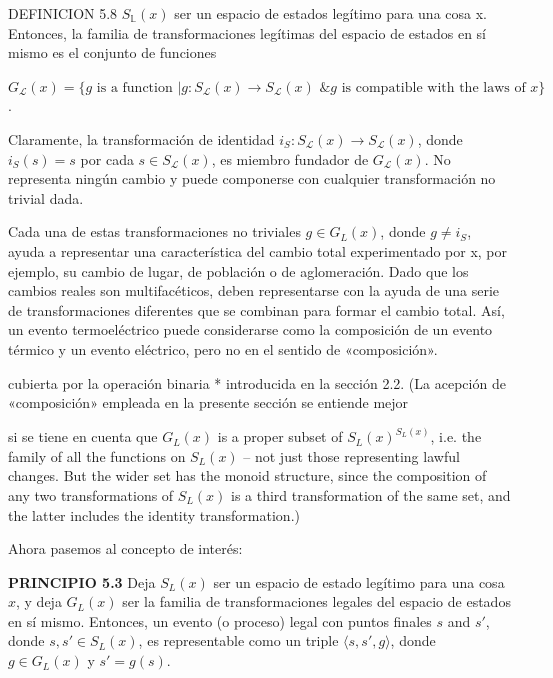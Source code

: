 \begin{justifying}
    DEFINICION 5.8 $S_{\mathbb{L}}(x)$ ser un espacio de estados legítimo para una cosa x. Entonces, la
familia de transformaciones legítimas del espacio de estados en sí mismo es el conjunto de
funciones
    \begin{center}
        $G_{\mathcal{L}}(x)=\{g \text{ is a function } |g:S_{\mathcal{L}}(x)\rightarrow S_{\mathcal{L}}(x)
        \text{ \& } g \text{ is compatible with the laws of } x\}$.
    \end{center}

    Claramente, la transformación de identidad $i_{S}: S_{\mathcal{L}}(x)\rightarrow S_{\mathcal{L}}(x)$, donde $i_{S}(s)=s$ por cada $s\in S_{\mathcal{L}}(x)$, es miembro fundador de $G_{\mathcal{L}}(x)$. No representa ningún cambio y puede componerse con cualquier transformación no trivial dada.

Cada una de estas transformaciones no triviales $g \in G_L(x)$, donde $g \neq i_S$, ayuda a representar una característica del cambio total experimentado por x, por ejemplo, su cambio de lugar, de población o de aglomeración. Dado que los cambios reales son multifacéticos, deben representarse con la ayuda de una serie de transformaciones diferentes que se combinan para formar el cambio total. Así, un evento termoeléctrico puede considerarse como la composición de un evento térmico y un evento eléctrico, pero no en el sentido de «composición».


    cubierta por la operación binaria * introducida en la sección 2.2. (La acepción
    de «composición» empleada en la presente sección se entiende mejor

    si se tiene en cuenta que $G_L(x)$ is a proper subset of $S_L(x)^{S_L(x)}$, i.e. the family of all the functions on $S_L(x)$ -- not just those representing lawful changes. But the wider set has the monoid structure, since the composition of any two transformations of $S_L(x)$ is a third transformation of the same set, and the latter includes the identity transformation.)
    
        Ahora pasemos al concepto de interés:
    
    \textbf{PRINCIPIO 5.3} Deja $S_L(x)$ ser un espacio de estado legítimo para una cosa $x$, y deja $G_L(x)$ ser la familia de transformaciones legales del espacio de estados    en sí mismo. Entonces, un evento (o proceso) legal con puntos finales $s$ and $s'$, donde $s, s' \in S_L(x)$, es representable como un triple $\langle s, s', g   \rangle$, donde $g \in G_L(x)$ y $s' = g(s)$.


\end{justifying}
